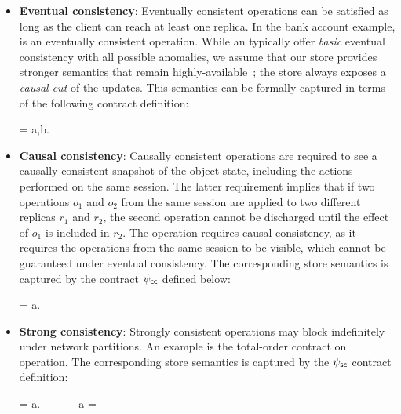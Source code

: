 \begin{itemize}

\item \textbf{Eventual consistency}: Eventually consistent operations can
	be satisfied as long as the client can reach at least one replica. In the
	bank account example,  is an eventually consistent operation.
	While an \ecds typically offer \emph{basic} eventual consistency with all
	possible anomalies, we assume that our store provides stronger semantics that
	remain highly-available~\cite{BailisHAT,COPS}; the store always exposes a
	\emph{causal cut} of the updates. This semantics can be formally captured in
	terms of the following contract definition:

  \vspace{-1mm}
  \begin{cmathpar}
  \ecc = \forall a,b. ~ \wedge {} \Rightarrow {}
  \end{cmathpar}

\item \textbf{Causal consistency}: Causally consistent operations are required
	to see a causally consistent snapshot of the object state, including the
	actions performed on the same session.  The latter requirement implies that
	if two operations $o_1$ and $o_2$ from the same session are applied to two
	different replicas $r_1$ and $r_2$, the second operation cannot be discharged
	until the effect of $o_1$ is included in $r_2$. The  operation
	requires causal consistency, as it requires the operations from the same
	session to be visible, which cannot be guaranteed under eventual consistency.
	The corresponding store semantics is captured by the contract $\psi_{\sf cc}$ defined
	below:

  \vspace{-1mm}
  \begin{cmathpar}
  \ccc = \forall a.~ \Rightarrow {}
  \end{cmathpar}

\item \textbf{Strong consistency}: Strongly consistent operations may block
  indefinitely under network partitions. An example is the total-order
  contract on  operation. The corresponding store semantics is
	captured by the $\psi_{\sf sc}$ contract definition:

  \vspace{-1mm}
  \begin{cmathpar}
  \scc = \forall a.~ \Rightarrow {} ~\vee~  ~\vee~ a = \cureff
  \end{cmathpar}
\end{itemize}

